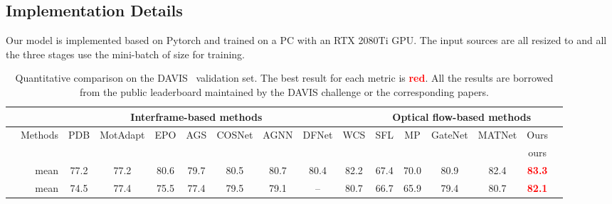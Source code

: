 \documentclass[sigconf]{acmart}
\newcommand{\textBC}[2]{\textbf{\textcolor{#1}{#2}}}
\begin{document}
\subsection{Implementation Details}
Our model is implemented based on Pytorch and trained on a PC with an RTX 2080Ti GPU. The input sources are all resized to  and all the three stages use the  mini-batch of size  for training.
\begin{table*}
	\small
	\centering
	\caption{Quantitative comparison on the DAVIS~\cite{davis16} validation set.
		The best result for each metric is \textBC{red}{red}.
		All the results are borrowed from the public leaderboard maintained by the DAVIS challenge or the corresponding papers.}
\resizebox{0.9\textwidth}{!} {
	\begin{tabular}{cr||cccccccc||cccccc}
	   \toprule[1pt]
& & &\multicolumn{5}{c}{Interframe-based methods}&&&\multicolumn{5}{c}{Optical flow-based methods} \\ \hline
		& Methods  &PDB  &MotAdapt  & EPO &AGS & COSNet  & AGNN & DFNet & WCS & SFL  & MP& GateNet&MATNet &Ours \\ 
		& &~\cite{PDB}&~\cite{MotAdapt}&~\cite{EPO}&~\cite{AGS}&\cite{COSNet}&~\cite{AGNN}&~\cite{DFNet}&~\cite{WCS}&~\cite{SFL}&~\cite{MP}&~\cite{GateNet}&~\cite{MATNet}&ours\\
		\hline \hline
		& mean     &77.2  &77.2  &80.6  &79.7  &80.5  & 80.7& 80.4 &82.2 &67.4  & 70.0 & 80.9 &82.4 & \textBC{red}{83.3}   \\
\hline
		& mean     &74.5  &77.4  &75.5  &77.4  &79.5  & 79.1 & -- & 80.7 & 66.7  &65.9  & 79.4  &80.7 & \textBC{red}{82.1} \\
\bottomrule[1pt]
	\end{tabular}
	}
	\label{table:Table1}
\end{table*}
\end{document}

